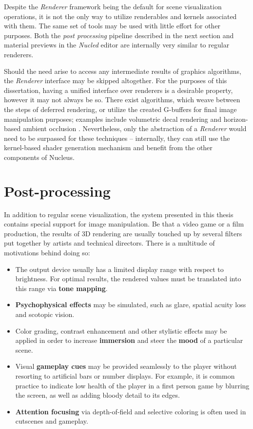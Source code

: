 Despite the \emph{Renderer} framework being the default for scene visualization operations, it is not the only way to utilize renderables and kernels associated with them. The same set of tools may be used with little effort for other purposes. Both the \emph{post processing} pipeline described in the next section and material previews in the \emph{Nucled} editor are internally very similar to regular renderers.

Should the need arise to access any intermediate results of graphics algorithms, the \emph{Renderer} interface may be skipped altogether. For the purposes of this dissertation, having a unified interface over renderers is a desirable property, however it may not always be so. There exist algorithms, which weave between the steps of deferred rendering, or utilize the created G-buffers for final image manipulation purposes; examples include volumetric decal rendering \cite{VolumeDecals} and horizon-based ambient occlusion \cite{HBAO}. Nevertheless, only the abstraction of a \emph{Renderer} would need to be surpassed for these techniques -- internally, they can still use the kernel-based shader generation mechanism and benefit from the other components of Nucleus.

\section{Post-processing}
\label{sec:PostProcessing}

In addition to regular scene visualization, the system presented in this thesis contains special support for image manipulation. Be that a video game or a film production, the results of 3D rendering are usually touched up by several filters put together by artists and technical directors. There is a multitude of motivations behind doing so:

\begin{itemize}
\item The output device usually has a limited display range with respect to brightness. For optimal results, the rendered values must be translated into this range via \textbf{tone mapping}.
\item \textbf{Psychophysical effects} may be simulated, such as glare, spatial acuity loss and scotopic vision.
\item Color grading, contrast enhancement and other stylistic effects may be applied in order to increase \textbf{immersion} and steer the \textbf{mood} of a particular scene.
\item Visual \textbf{gameplay cues} may be provided seamlessly to the player without resorting to artificial bars or number displays. For example, it is common practice to indicate low health of the player in a first person game by blurring the screen, as well as adding bloody detail to its edges.
\item \textbf{Attention focusing} via depth-of-field and selective coloring is often used in cutscenes and gameplay.
\end{itemize}

